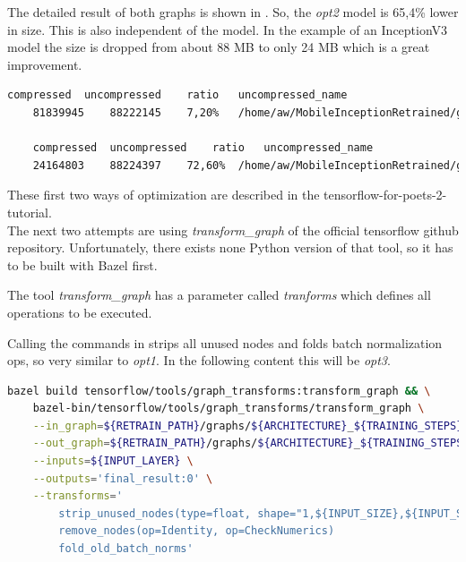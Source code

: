 The detailed result of both graphs is shown in . So, the \textit{opt2} model is 65,4\% lower in size. This is also independent of the model. In the example of an InceptionV3 model the size is dropped from about 88 MB to only 24 MB which is a great improvement. 

\begin{minipage}{\linewidth}
\begin{lstlisting}[caption=Output of gzip, label=list:gzip_res, language=bash]
	compressed	uncompressed	ratio	uncompressed_name
	81839945	88222145	7,20%	/home/aw/MobileInceptionRetrained/graphs/inception_v3_4000/opt1_retrained_dog_graph_inception_v3_4000_0.03.pb

	compressed	uncompressed	ratio	uncompressed_name
	24164803	88224397	72,60%	/home/aw/MobileInceptionRetrained/graphs/inception_v3_4000/opt2_retrained_dog_graph_inception_v3_4000_0.03.pb
\end{lstlisting}
\end{minipage}


These first two ways of optimization are described in the tensorflow-for-poets-2-tutorial. \citep{TensorflowDemo} \\

The next two attempts are using \textit{transform_graph} of the official tensorflow github repository. Unfortunately, there exists none Python version of that tool, so it has to be built with Bazel first. 

The tool \textit{transform_graph} has a parameter called \textit{tranforms} which defines all operations to be executed. 

Calling the commands in  strips all unused nodes and folds batch normalization ops, so very similar to \textit{opt1}. In the following content this will be \textit{opt3}.

\begin{minipage}{\linewidth}
\begin{lstlisting}[caption=Build and call of \textit{transform_graph}, label=list:transform_graph_opt3, language=bash]
	bazel build tensorflow/tools/graph_transforms:transform_graph && \
	bazel-bin/tensorflow/tools/graph_transforms/transform_graph \
	--in_graph=${RETRAIN_PATH}/graphs/${ARCHITECTURE}_${TRAINING_STEPS}/retrained_dog_graph_${ARCHITECTURE}_${TRAINING_STEPS}_${LEARNING_RATE}.pb \
	--out_graph=${RETRAIN_PATH}/graphs/${ARCHITECTURE}_${TRAINING_STEPS}/opt3_retrained_dog_graph_${ARCHITECTURE}_${TRAINING_STEPS}_${LEARNING_RATE}.pb \
	--inputs=${INPUT_LAYER} \
	--outputs='final_result:0' \
	--transforms='
		strip_unused_nodes(type=float, shape="1,${INPUT_SIZE},${INPUT_SIZE},3")
		remove_nodes(op=Identity, op=CheckNumerics)
		fold_old_batch_norms'
\end{lstlisting}
\end{minipage}


